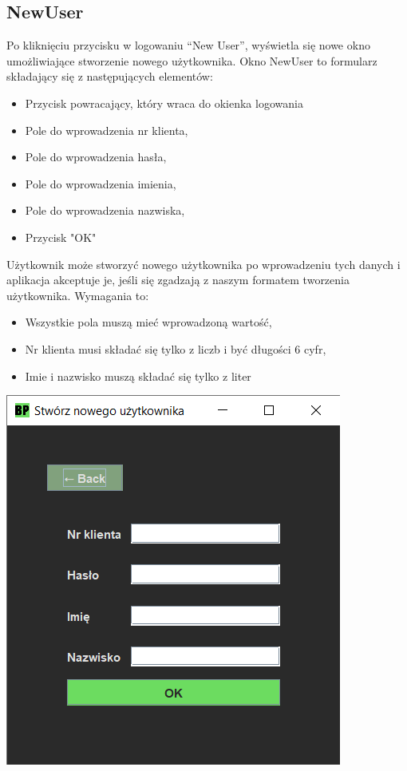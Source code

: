 \documentclass[12pt, letterpaper]{article}
\begin{document}
\newpage

\subsection{NewUser}
\quad Po kliknięciu przycisku w logowaniu “New User”, wyświetla się nowe okno umożliwiające stworzenie nowego użytkownika.
Okno NewUser to formularz składający się z następujących elementów: 

\begin{itemize}
\item Przycisk powracający, który wraca do okienka logowania
\item Pole do wprowadzenia nr klienta,
\item Pole do wprowadzenia hasła,
\item Pole do wprowadzenia imienia,
\item Pole do wprowadzenia nazwiska,
\item Przycisk "OK"
\end{itemize}

\quad Użytkownik może stworzyć nowego użytkownika po wprowadzeniu tych danych i aplikacja akceptuje je, jeśli się zgadzają z naszym formatem tworzenia użytkownika. Wymagania to:

\begin{itemize}
\item Wszystkie pola muszą mieć wprowadzoną wartość,
\item Nr klienta musi składać się tylko z liczb i być długości 6 cyfr,
\item Imie i nazwisko muszą składać się tylko z liter
\end{itemize}

\begin{center}
	\includegraphics[scale=0.6]{newuser}
\end{center}
\end{document}
